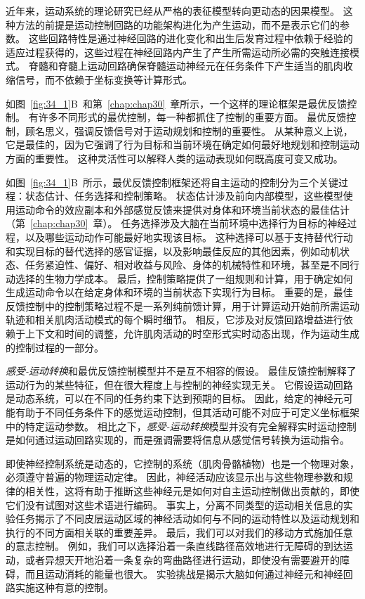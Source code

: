 近年来，运动系统的理论研究已经从严格的表征模型转向更动态的因果模型。
这种方法的前提是运动控制回路的功能架构进化为产生运动，而不是表示它们的参数。
这些回路特性是通过神经回路的进化变化和出生后发育过程中依赖于经验的适应过程获得的，这些过程在神经回路内产生了产生所需运动所必需的突触连接模式。
脊髓和脊髓上运动回路确保脊髓运动神经元在任务条件下产生适当的肌肉收缩信号，而不依赖于坐标变换等计算形式。


如图~\ref{fig:34_1}B~和第~\ref{chap:chap30}~章所示，一个这样的理论框架是最优反馈控制。
有许多不同形式的最优控制，每一种都抓住了控制的重要方面。
最优反馈控制，顾名思义，强调反馈信号对于运动规划和控制的重要性。
从某种意义上说，它是最佳的，因为它强调了行为目标和当前环境在确定如何最好地规划和控制运动方面的重要性。
这种灵活性可以解释人类的运动表现如何既高度可变又成功。


如图~\ref{fig:34_1}B~所示，最优反馈控制框架还将自主运动的控制分为三个关键过程：状态估计、任务选择和控制策略。
状态估计涉及前向内部模型，这些模型使用运动命令的效应副本和外部感觉反馈来提供对身体和环境当前状态的最佳估计（第~\ref{chap:chap30}~章）。
任务选择涉及大脑在当前环境中选择行为目标的神经过程，以及哪些运动动作可能最好地实现该目标。
这种选择可以基于支持替代行动和实现目标的替代选择的感官证据，以及影响最佳反应的其他因素，例如动机状态、任务紧迫性、偏好、相对收益与风险、身体的机械特性和环境，甚至是不同行动选择的生物力学成本。
最后，控制策略提供了一组规则和计算，用于确定如何生成运动命令以在给定身体和环境的当前状态下实现行为目标。
重要的是，最佳反馈控制中的控制策略过程不是一系列纯前馈计算，用于计算运动开始前所需运动轨迹和相关肌肉活动模式的每个瞬时细节。
相反，它涉及对反馈回路增益进行依赖于上下文和时间的调整，允许肌肉活动的时空形式实时动态出现，作为运动生成的控制过程的一部分。


\textit{感受-运动转换}和最优反馈控制模型并不是互不相容的假设。
最佳反馈控制解释了运动行为的某些特征，但在很大程度上与控制的神经实现无关。
它假设运动回路是动态系统，可以在不同的任务约束下达到预期的目标。
因此，给定的神经元可能有助于不同任务条件下的感觉运动控制，但其活动可能不对应于可定义坐标框架中的特定运动参数。
相比之下，\textit{感受-运动转换}模型并没有完全解释实时运动控制是如何通过运动回路实现的，而是强调需要将信息从感觉信号转换为运动指令。


即使神经控制系统是动态的，它控制的系统（肌肉骨骼植物）也是一个物理对象，必须遵守普遍的物理运动定律。
因此，神经活动应该显示出与这些物理参数和规律的相关性，这将有助于推断这些神经元是如何对自主运动控制做出贡献的，即使它们没有试图对这些术语进行编码。
事实上，分离不同类型的运动相关信息的实验任务揭示了不同皮层运动区域的神经活动如何与不同的运动特性以及运动规划和执行的不同方面相关联的重要差异。
最后，我们可以对我们的移动方式施加任意的意志控制。
例如，我们可以选择沿着一条直线路径高效地进行无障碍的到达运动，或者异想天开地沿着一条复杂的弯曲路径进行运动，即使没有需要避开的障碍，而且运动消耗的能量也很大。
实验挑战是揭示大脑如何通过神经元和神经回路实施这种有意的控制。



